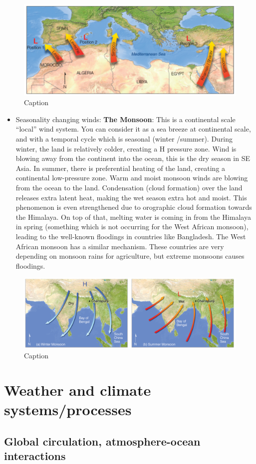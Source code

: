 \documentclass[oneside]{book}
\providecommand{\tightlist}{%
  \setlength{\itemsep}{0pt}\setlength{\parskip}{0pt}}
\begin{document}
\begin{figure}

{\centering \includegraphics[width=0.6\linewidth]{figures/Figure430} 

}

\caption{Caption}\label{fig:Sahara}
\end{figure}

\begin{itemize}
\tightlist
\item
  Seasonality changing winds: \textbf{The Monsoon}: This is a
  continental scale ``local'' wind system. You can consider it as a sea
  breeze at continental scale, and with a temporal cycle which is
  seasonal (winter /summer). During winter, the land is relatively
  colder, creating a H pressure zone. Wind is blowing away from the
  continent into the ocean, this is the dry season in SE Asia. In
  summer, there is preferential heating of the land, creating a
  continental low-pressure zone. Warm and moist monsoon winds are
  blowing from the ocean to the land. Condensation (cloud formation)
  over the land releases extra latent heat, making the wet season extra
  hot and moist. This phenomenon is even strengthened due to orographic
  cloud formation towards the Himalaya. On top of that, melting water is
  coming in from the Himalaya in spring (something which is not
  occurring for the West African monsoon), leading to the well-known
  floodings in countries like Bangladesh. The West African monsoon has a
  similar mechanism. These countries are very depending on monsoon rains
  for agriculture, but extreme monsoons causes floodings.
\end{itemize}

\begin{figure}

{\centering \includegraphics[width=0.6\linewidth]{figures/Figure431} 

}

\caption{Caption}\label{fig:Monsoon}
\end{figure}

\part{Weather and climate
systems/processes}\label{part-weather-and-climate-systemsprocesses}

\chapter{Global circulation, atmosphere-ocean interactions}\label{GC}



\end{document}
